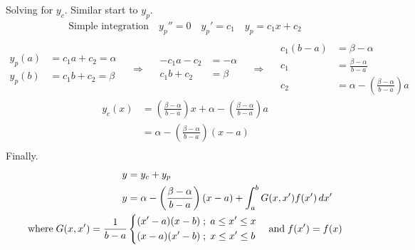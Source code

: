 \documentclass{article}
\begin{document}
{\begin{enumerate}
		Solving for $y_c$. Similar start to $y_p$.
		\begin{equation*}
			\begin{split}
				\text{Simple integration} \quad y_p'' = 0 \quad y_p' = c_1 \quad y_p = c_1 x + c_2 \\
			\end{split}
		\end{equation*}
		\begin{equation*}
			\begin{aligned}
				y_p(a) &= c_1 a + c_2 = \alpha \\
				y_p(b) &= c_1 b + c_2 = \beta
			\end{aligned}
			\quad \Rightarrow \quad
			\begin{aligned}
				-c_1 a - c_2 &= -\alpha \\
				c_1 b + c_2 &= \beta
			\end{aligned}
			\quad \Rightarrow \quad
			\begin{aligned}
				c_1 (b - a) &= \beta - \alpha \\
				c_1 &= \frac{\beta - \alpha}{b - a} \\
				c_2 &= \alpha - \left( \frac{\beta - \alpha}{b - a} \right) a
			\end{aligned}
		\end{equation*}
		\begin{equation*}
			\begin{split}
				y_c(x) &= \left( \frac{\beta - \alpha}{b - a} \right) x + \alpha - \left( \frac{\beta - \alpha}{b - a} \right) a \\
				&= \alpha - \left( \frac{\beta - \alpha}{b - a} \right) (x - a) \\
			\end{split}
		\end{equation*}
		Finally.
		\begin{equation*}
			\begin{split}
				y &= y_c + y_p \\
				y &= \alpha - \left( \frac{\beta - \alpha}{b - a} \right) (x - a) + \int_{a}^{b} G(x,x') f(x') \, dx' \\
				\text{where} \; G(x,x') = \frac{1}{b - a}
				&\begin{dcases}
					(x' - a) (x - b) \; ; \; a \leq x' \leq x \\
					(x - a) (x' - b) \; ; \; x \leq x' \leq b
				\end{dcases}
				\quad \text{and} \; f(x') = f(x)
			\end{split}
		\end{equation*}
			

\end{enumerate}}
\end{document}
